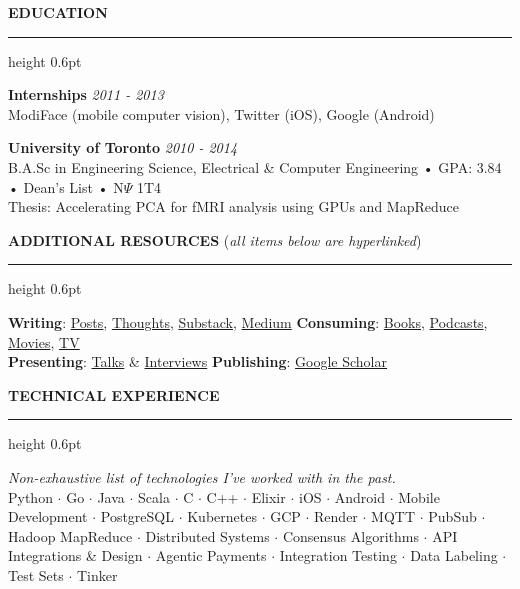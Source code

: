 \documentclass[10pt]{resume}
\newenvironment{rSectionCompact}[1]{
  \smallskip
  \vspace{0.1em}
  \textbf{\textcolor{Cerulean}{\MakeUppercase{#1}}}
  \vspace{0.2em}
  {\color{Blue}\hrule height 0.6pt}
  \vspace{0.6em}
  \begin{list}{}{
    \setlength{\leftmargin}{0em}
  }
  \item[]
}{
    \vspace{0.15em}
    \end{list}
}
\begin{document}
\begin{rSectionCompact}{Education}
    \textbf{Internships} \hfill \textit{2011 - 2013} \\
    ModiFace (mobile computer vision), Twitter (iOS), Google (Android)

    \vspace{0.25em}
    \textbf{University of Toronto} \hfill \textit{2010 - 2014} \\
    B.A.Sc in Engineering Science, Electrical \& Computer Engineering • GPA: 3.84 • Dean's List • N$\Psi$ 1T4 \\
    Thesis: Accelerating PCA for fMRI analysis using GPUs and MapReduce

\end{rSectionCompact}


\vspace{0.15em}
\textbf{\textcolor{Cerulean}{\MakeUppercase{Additional Resources}}} (\textit{\small all items below are hyperlinked})
\vspace{0.15em}
{\color{Blue}\hrule height 0.6pt}
\vspace{0.4em}
\small
\textbf{Writing}: \href{https://olshansky.info/posts}{Posts}, \href{https://olshansky.info/thoughts}{Thoughts}, \href{https://olshansky.substack.com}{Substack}, \href{https://olshansky.medium.com}{Medium} \hfill
\textbf{Consuming}: \href{https://olshansky.info/book}{Books}, \href{https://olshansky.notion.site/768504560fd54cdaa7e24b6c3f31a21e}{Podcasts}, \href{https://olshansky.info/movie}{Movies}, \href{https://olshansky.info/tv}{TV} \\
\textbf{Presenting}: \href{https://www.youtube.com/playlist?list=PLeHvNSh0enXSflgNf-YC6jW6K3Fh4cS5E}{Talks} \& \href{https://www.youtube.com/playlist?list=PLeHvNSh0enXSflgNf-YC6jW6K3Fh4cS5E}{Interviews} \hfill
\textbf{Publishing}: \href{https://scholar.google.com/citations?user=pkPj80UAAAAJ&hl=en&oi=sra}{Google Scholar}


\begin{rSectionCompact}{Technical Experience}
    \small
    \textit{Non-exhaustive list of technologies I've worked with in the past.} \\[0.15em]
    Python $\cdot$ Go $\cdot$ Java $\cdot$ Scala $\cdot$ C $\cdot$ C++ $\cdot$ Elixir $\cdot$ iOS $\cdot$ Android $\cdot$ Mobile Development $\cdot$ PostgreSQL $\cdot$ Kubernetes $\cdot$ GCP $\cdot$ Render $\cdot$ MQTT $\cdot$ PubSub $\cdot$ Hadoop MapReduce $\cdot$ Distributed Systems $\cdot$ Consensus Algorithms $\cdot$ API Integrations \& Design $\cdot$ Agentic Payments $\cdot$ Integration Testing $\cdot$ Data Labeling $\cdot$ Test Sets $\cdot$ Tinker
\end{rSectionCompact}
\end{document}
